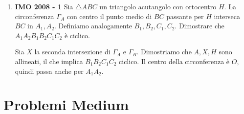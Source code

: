 \begin{enumerate}
    \item \textbf{IMO 2008 - 1} Sia $\triangle ABC$ un triangolo acutangolo con ortocentro $H$. La circonferenza $\Gamma_A$ con centro il punto medio di $BC$ passante per $H$ interseca $BC$ in $A_1,A_2$. Definiamo analogamente $B_1,B_2,C_1,C_2$. Dimostrare che $A_1A_2B_1B_2C_1C_2$ è ciclico.  
    
    \begin{sol}
    Sia $X$ la seconda intersezione di $\Gamma_A$ e $\Gamma_B$. Dimostriamo che $A,X,H$ sono allineati, il che implica $B_1B_2C_1C_2$ ciclico. Il centro della circonferenza è $O$, quindi passa anche per $A_1A_2$.
    \end{sol}
    
\end{enumerate}


\clearpage

\section{Problemi Medium}
